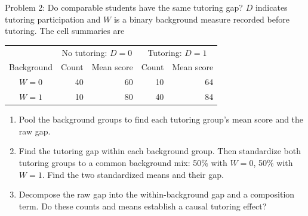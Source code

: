 \documentclass[notes,10pt, aspectratio=169]{beamer}
\begin{document}
\begin{frame}{Problem 2: Do comparable students have the same tutoring gap?}
$D$ indicates tutoring participation and $W$ is a binary background measure recorded before tutoring. The cell summaries are
\begin{center}
\begin{tabular}{c|rr|rr}
 & \multicolumn{2}{c|}{No tutoring: $D=0$} & \multicolumn{2}{c}{Tutoring: $D=1$} \\
Background & Count & Mean score & Count & Mean score \\ \hline
$W=0$ & 40 & 60 & 10 & 64 \\
$W=1$ & 10 & 80 & 40 & 84
\end{tabular}
\end{center}
\begin{enumerate}
\setlength{\itemsep}{8pt}
\item Pool the background groups to find each tutoring group's mean score and the raw gap.
\item Find the tutoring gap within each background group. Then standardize both tutoring groups to a common background mix: 50\% with $W=0$, 50\% with $W=1$. Find the two standardized means and their gap.
\item Decompose the raw gap into the within-background gap and a composition term. Do these counts and means establish a causal tutoring effect?
\end{enumerate}
\end{frame}
\end{document}
